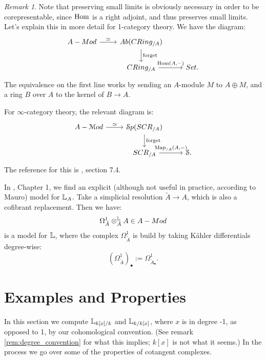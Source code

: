 \documentclass[10pt,a4paper,reqno,oneside]{book} %
\theoremstyle{plain}
\theoremstyle{definition}
\theoremstyle{remark}
\newtheorem{rem}[thm]{Remark}
\numberwithin{equation}{section}
\begin{document}
\begin{rem}
Note that preserving small limits is obviously necessary in order to be corepresentable, since $\operatorname{Hom}$ is a right adjoint,
and thus preserves small limits. Let's explain this in more detail
for 1-category theory. We have the diagram:
\[
\begin{tikzcd}
A-Mod \arrow{r}{\simeq} & Ab(CRing_{/A})\arrow{d}{\text{forget}} & \\
 & CRing_{/A} \arrow{r}{\Hom(A, -)} & Set .
\end{tikzcd}
\]
The equivalence on the first line works by sending an $A$-module $M$ to $A \oplus M$, and a ring $B$ over $A$ to the kernel
of $B \to A$. 

For $\infty$-category theory, the relevant diagram is:
\[
\begin{tikzcd}
A-\cM od \arrow{r}{\simeq} & \cS p(SCR_{/A})\arrow{d}{\text{forget}} & \\
 & SCR_{/A} \arrow{r}{\Map_{/A}(A, -)} & \cS .
\end{tikzcd}
\]
The reference for this is \cite{Lurie_Higher_algebra}, section 7.4.
\end{rem}


In \cite{HAG-II}, Chapter 1, we find an explicit (although not useful in practice, according to Mauro) model 
for $\mathbb L_A$. Take a simplicial resolution $\tilde A \to A$, which is also a cofibrant replacement. Then we have:
\[	 \Omega_{\tilde A}^1 \otimes^{\mathbb L}_{\tilde A} A \in A-Mod	\]
is a model for $\mathbb L$, where the complex $\Omega_{\tilde A}^1$ is build by taking K\"ahler differentials degree-wise:
\[	(\Omega_{\tilde A}^1)_{\bullet} := \Omega^1_{\tilde A_{\bullet}}.	\]





\section{Examples and Properties}
\label{sect:cc_eg}

In this section we compute $\mathbb L_{k[x]/k}$ and $\mathbb L_{k/k[x]}$, where $x$ is in degree -1, as opposed to 1, by our 
cohomological convention. (See remark \ref{rem:degree_convention} for what this implies; $k[x]$ is not what it seems.)
In the process we go over some of the properties of cotangent complexes.
\end{document}
